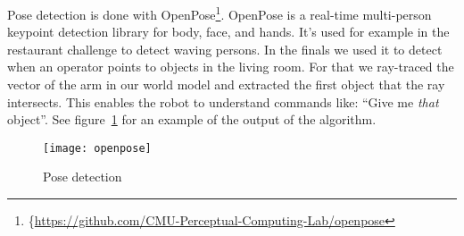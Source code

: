 Pose detection is done with OpenPose\footnote{\{\url{https://github.com/CMU-Perceptual-Computing-Lab/openpose}}.
OpenPose is a real-time multi-person keypoint detection library for body, face, and hands.
It's used for example in the restaurant challenge to detect waving persons.
In the finals we used it to detect when an operator points to objects in the living room.
For that we ray-traced the vector of the arm in our world model and extracted the first object that the ray intersects.
This enables the robot to understand commands like: ``Give me \emph{that} object''.
See figure~\ref{fig:pose_detection} for an example of the output of the algorithm.

\begin{figure}[H]
	\centering
	\texttt{[image: openpose]}
	\caption{Pose detection}
	\label{fig:pose_detection}
\end{figure} 